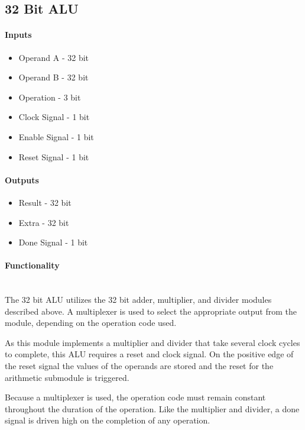 \documentclass{article}
\begin{document}
    \subsection{32 Bit ALU}

    \paragraph{Inputs}
    \begin{itemize}
        \item Operand A - 32 bit
        \item Operand B - 32 bit
        \item Operation - 3 bit
        \item Clock Signal - 1 bit
        \item Enable Signal - 1 bit
        \item Reset Signal - 1 bit
    \end{itemize}

    \paragraph{Outputs}
    \begin{itemize}
        \item Result - 32 bit
        \item Extra - 32 bit
        \item Done Signal - 1 bit
    \end{itemize}

    \paragraph{Functionality}
    \hfill\\
    The 32 bit ALU utilizes the 32 bit adder, multiplier, and divider modules
    described above. A multiplexer is used to select the appropriate output
    from the module, depending on the operation code used.

    As this module implements a multiplier and divider that take several
    clock cycles to complete, this ALU requires a reset and clock signal.
    On the positive edge of the reset signal the values of the operands
    are stored and the reset for the arithmetic submodule is triggered.

    Because a multiplexer is used, the operation code must remain constant
    throughout the duration of the operation. Like the multiplier and
    divider, a done signal is driven high on the completion of any operation.
\end{document}
